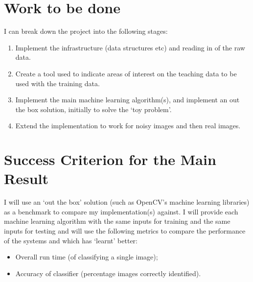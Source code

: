 
\section*{Work to be done}

I can break down the project into the following stages:

\begin{enumerate}

\item 
Implement the infrastructure (data structures etc) and reading in of the raw
data.

\item 
Create a tool used to indicate areas of interest on the teaching data to be used 
with the training data.

\item 
Implement the main machine learning algorithm(s), and implement an out the 
box solution, initially to solve the `toy problem'. 

\item 
Extend the implementation to work for noisy images and then real images.

\end{enumerate}




\section*{Success Criterion for the Main Result}

I will use an `out the box' solution (such as OpenCV's machine learning 
libraries) as a benchmark to compare my implementation(s) against. I 
will provide each machine learning algorithm with the same inputs for training 
and the same inputs for testing and will use the following metrics to compare 
the performance of the systems and which has `learnt' better:
\begin{itemize}
    \item Overall run time (of classifying a single image);
    \item Accuracy of classifier (percentage images correctly identified).
\end{itemize}





